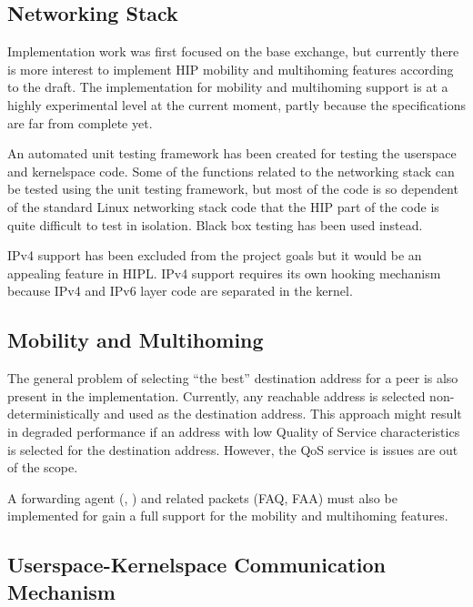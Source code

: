 \subsection{Networking Stack}
\label{sec:networking_stack_future_work}

Implementation work was first focused on the base exchange, but
currently there is more interest to implement HIP mobility and
multihoming features according to the \cite{hip-mm} draft. The
implementation for mobility and multihoming support is at a highly
experimental level at the current moment, partly because the
specifications are far from complete yet.

An automated unit testing framework has been created for testing the
userspace and kernelspace code. Some of the functions related to the
networking stack can be tested using the unit testing framework, but
most of the code is so dependent of the standard Linux networking
stack code that the HIP part of the code is quite difficult to test in
isolation. Black box testing has been used instead.

IPv4 support has been excluded from the project goals but it would be
an appealing feature in HIPL. IPv4 support requires its own hooking
mechanism because IPv4 and IPv6 layer code are separated in the
kernel.

\subsection{Mobility and Multihoming}
\label{sec:future_mobility_and_multihoming}

The general problem of selecting ``the best'' destination address for
a peer is also present in the implementation. Currently, any reachable
address is selected non-deterministically and used as the destination
address. This approach might result in degraded performance if an
address with low Quality of Service characteristics is selected for
the destination address. However, the QoS service is issues are out of
the scope.

A forwarding agent (\cite{hiparch}, \cite{hip-mm}) and related packets
(FAQ, FAA) must also be implemented for gain a full support for the
mobility and multihoming features.

\subsection{Userspace-Kernelspace Communication Mechanism}
\label{sec:future_com_mechanism}

